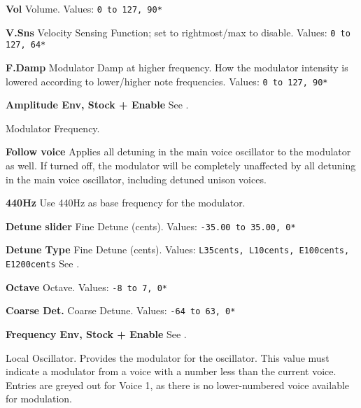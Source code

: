    \begin{enumber}
      \item \textbf{Vol}
         Volume.
         Values: \texttt{0 to 127, 90*}
      \item \textbf{V.Sns}
         Velocity Sensing Function; set to rightmost/max to disable.
         Values: \texttt{0 to 127, 64*}
      \item \textbf{F.Damp}
         Modulator Damp at higher frequency.
         How the modulator intensity is lowered according to lower/higher
         note frequencies.
         Values: \texttt{0 to 127, 90*}
      \item \textbf{Amplitude Env, Stock + Enable}
         See .
   \end{enumber}

   Modulator Frequency.


   \begin{enumber}
     \item \textbf{Follow voice}
        Applies all detuning in the main voice oscillator to the modulator as
        well. If turned off, the modulator will be completely unaffected by all
        detuning in the main voice oscillator, including detuned unison voices.
     \item \textbf{440Hz}
        Use 440Hz as base frequency for the modulator.
      \item \textbf{Detune slider}
         Fine Detune (cents).
         Values: \texttt{-35.00 to 35.00, 0*}
      \item \textbf{Detune Type}
         Fine Detune (cents).
         Values: \texttt{L35cents, L10cents, E100cents, E1200cents}
         See .
      \item \textbf{Octave}
         Octave.
         Values: \texttt{-8 to 7, 0*}
      \item \textbf{Coarse Det.}
         Coarse Detune.
         Values: \texttt{-64 to 63, 0*}
      \item \textbf{Frequency Env, Stock + Enable}
         See .
   \end{enumber}

   Local Oscillator.
   Provides the modulator for the oscillator.
   This value must indicate a modulator from a voice with a number less than
   the current voice. Entries are greyed out for Voice 1, as there is no
   lower-numbered voice available for modulation.

